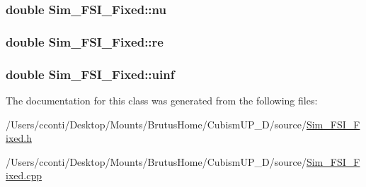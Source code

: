 \subsubsection[{nu}]{\setlength{\rightskip}{0pt plus 5cm}double Sim\+\_\+\+F\+S\+I\+\_\+\+Fixed\+::nu\hspace{0.3cm}{\ttfamily [protected]}}\label{class_sim___f_s_i___fixed_a309a6019a5f0d5bb2eed40d2afc362e8}
\hypertarget{class_sim___f_s_i___fixed_a439d225a6a3f4dcba00ace7e66adb049}{}
\subsubsection[{re}]{\setlength{\rightskip}{0pt plus 5cm}double Sim\+\_\+\+F\+S\+I\+\_\+\+Fixed\+::re\hspace{0.3cm}{\ttfamily [protected]}}\label{class_sim___f_s_i___fixed_a439d225a6a3f4dcba00ace7e66adb049}
\hypertarget{class_sim___f_s_i___fixed_adbebdb69690216b89cf81339ac4a5e0e}{}
\subsubsection[{uinf}]{\setlength{\rightskip}{0pt plus 5cm}double Sim\+\_\+\+F\+S\+I\+\_\+\+Fixed\+::uinf\hspace{0.3cm}{\ttfamily [protected]}}\label{class_sim___f_s_i___fixed_adbebdb69690216b89cf81339ac4a5e0e}


The documentation for this class was generated from the following files\+:\begin{DoxyCompactItemize}
\item 
/\+Users/cconti/\+Desktop/\+Mounts/\+Brutus\+Home/\+Cubism\+U\+P\+\_\+D/source/\hyperlink{_sim___f_s_i___fixed_8h}{Sim\+\_\+\+F\+S\+I\+\_\+\+Fixed.\+h}\item 
/\+Users/cconti/\+Desktop/\+Mounts/\+Brutus\+Home/\+Cubism\+U\+P\+\_\+D/source/\hyperlink{_sim___f_s_i___fixed_8cpp}{Sim\+\_\+\+F\+S\+I\+\_\+\+Fixed.\+cpp}\end{DoxyCompactItemize}

